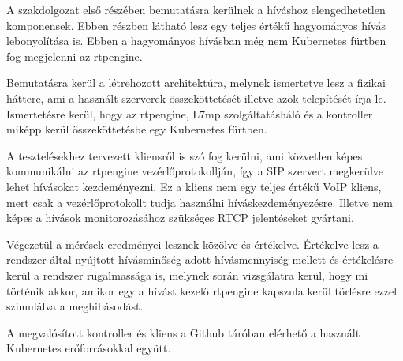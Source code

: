 A szakdolgozat első részében bemutatásra kerülnek a híváshoz elengedhetetlen komponensek. 
Ebben részben látható lesz egy teljes értékű hagyományos hívás lebonyolítása is. Ebben a 
hagyományos hívásban még nem Kubernetes fürtben fog megjelenni az rtpengine. 

Bemutatásra kerül a létrehozott architektúra, melynek ismertetve lesz a fizikai háttere, 
ami a használt szerverek összeköttetését illetve azok telepítését írja le. Ismertetésre 
kerül, hogy az rtpengine, L7mp szolgáltatásháló és a kontroller miképp kerül 
összeköttetésbe egy Kubernetes fürtben. 

A tesztelésekhez tervezett kliensről is szó fog kerülni, ami közvetlen képes kommunikálni 
az rtpengine vezérlőprotokollján, így a SIP szervert megkerülve lehet hívásokat 
kezdeményezni. Ez a kliens nem egy teljes értékű VoIP kliens, mert csak a 
vezérlőprotokollt tudja használni híváskezdeményezésre. Illetve nem képes a hívások 
monitorozásához szükséges RTCP jelentéseket gyártani. 

Végezetül a mérések eredményei lesznek közölve és értékelve. Értékelve lesz a rendszer 
által nyújtott hívásminőség adott hívásmennyiség mellett és értékelésre kerül a rendszer 
rugalmassága is, melynek során vizsgálatra kerül, hogy mi történik akkor, amikor egy a 
hívást kezelő rtpengine kapszula kerül törlésre ezzel szimulálva a meghibásodást.

A megvalósított kontroller és kliens a \cite{repo} Github táróban elérhető a használt Kubernetes erőforrásokkal együtt. 